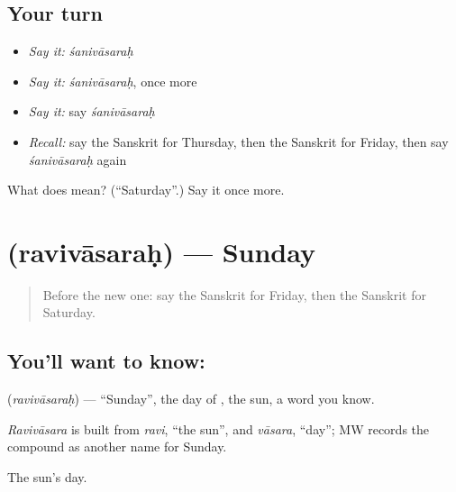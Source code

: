 \subsection*{Your turn}
\begin{itemize}
\raggedright
  \item \emph{Say it:} \emph{śanivāsaraḥ}
  \item \emph{Say it:} \emph{śanivāsaraḥ}, once more
  \item \emph{Say it:} say \emph{śanivāsaraḥ}
  \item \emph{Recall:} say the Sanskrit for Thursday, then the Sanskrit for Friday, then say \emph{śanivāsaraḥ} again
\end{itemize}

\begin{tcolorbox}[breakable,colback=teal!4,colframe=teal!35!black,title={Before you move on}]
What does  mean? (\textquotedblleft{}Saturday\textquotedblright{}.) Say it once more.
\end{tcolorbox}
\section[\texorpdfstring{\sk{रविवासरः} (ravivāsaraḥ)}{रविवासरः (ravivāsaraḥ)}]{ (ravivāsaraḥ) — Sunday}

\label{lesson:SA-C86-sunday}



\begin{quote}
Before the new one: say the Sanskrit for Friday, then the Sanskrit for Saturday.
\end{quote}

\subsection*{You'll want to know: }
\textbf{} (\emph{ravivāsaraḥ}) — \textquotedblleft{}Sunday\textquotedblright{}, the day of \textbf{}, the sun, a word you know.

\begin{cousinweb}
\emph{Ravivāsara} is built from \emph{ravi}, \textquotedblleft{}the sun\textquotedblright{}, and \emph{vāsara}, \textquotedblleft{}day\textquotedblright{}; MW records the compound as another name for Sunday.
\end{cousinweb}

\begin{grammarlens}[title={What you've built}]
The sun's day.
\end{grammarlens}

